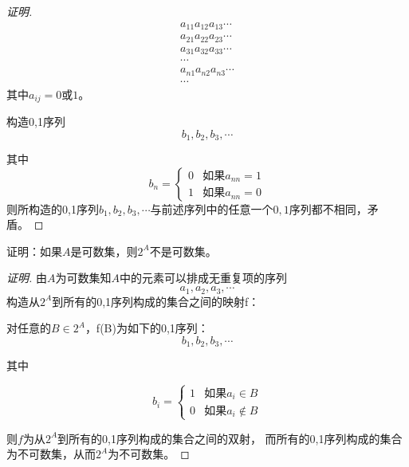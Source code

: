 \documentclass{article}
\begin{document}
\begin{CJK}{UTF8}{gbsn}
\begin{proof}[证明]
  \begin{align*}
    a_{11}a_{12}a_{13}\cdots\\
    a_{21}a_{22}a_{23}\cdots\\
    a_{31}a_{32}a_{33}\cdots\\
    \cdots\\
    a_{n1}a_{n2}a_{n3}\cdots\\
    \cdots
  \end{align*}
  其中$a_{ij}=0$或$1$。

  构造0,1序列
\[b_1,b_2,b_3,\cdots\]

其中
\[b_n=
\begin{cases}
  0&\text{如果}a_{nn}=1\\
  1&\text{如果}a_{nn}=0
\end{cases}\]
则所构造的0,1序列$b_1,b_2,b_3,\cdots$与前述序列中的任意一个$0,1$序列都不相同，矛盾。
\end{proof}
\begin{Exercise}
  证明：如果$A$是可数集，则$2^A$不是可数集。
\end{Exercise}
\begin{proof}[证明]
  由$A$为可数集知$A$中的元素可以排成无重复项的序列
  \[a_1,a_2,a_3,\cdots\]
  构造从$2^A$到所有的0,1序列构成的集合之间的映射f：

  对任意的$B\in 2^A$，f(B)为如下的0,1序列：
  \[b_1,b_2,b_3,\cdots\]

  其中

  \[b_i=\begin{cases}
    1& \text{如果}a_i\in B\\
    0& \text{如果}a_i\notin B
  \end{cases}\]
  
  则$f$为从$2^A$到所有的0,1序列构成的集合之间的双射，
  而所有的0,1序列构成的集合为不可数集，从而$2^A$为不可数集。
\end{proof}

\end{CJK}
\end{document}
